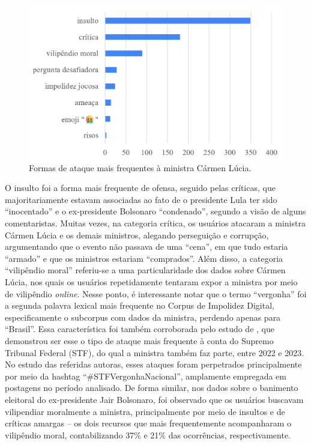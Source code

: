 \documentclass[portuguese]{textolivre}
\begin{document}
\begin{figure}[h!]
\centering
\begin{minipage}{.70\textwidth}
\includegraphics[width =\textwidth]{Fig7.png}
\caption{Formas de ataque mais frequentes à ministra Cármen Lúcia.}
\label{graf-5}
\end{minipage}
\end{figure}

O insulto foi a forma mais frequente de ofensa, seguido pelas críticas, que majoritariamente estavam associadas ao fato de o presidente Lula ter sido ``inocentado'' e o ex-presidente Bolsonaro ``condenado'', segundo a visão de alguns comentaristas. Muitas vezes, na categoria crítica, os usuários atacaram a ministra Cármen Lúcia e os demais ministros, alegando perseguição e corrupção, argumentando que o evento não passava de uma ``cena'', em que tudo estaria ``armado'' e que os ministros estariam ``comprados''. Além disso, a categoria ``vilipêndio moral'' referiu-se a uma particularidade dos dados sobre Cármen Lúcia, nos quais os usuários repetidamente tentaram expor a ministra por meio de vilipêndio \textit{online}. Nesse ponto, é interessante notar que o termo ``vergonha'' foi a segunda palavra lexical mais frequente no Corpus de Impolidez Digital, especificamente o subcorpus com dados da ministra, perdendo apenas para ``Brasil''. Essa característica foi também corroborada pelo estudo de \textcite{oliveira2024}, que demonstrou ser esse o tipo de ataque mais frequente à conta do Supremo Tribunal Federal (STF), do qual a ministra também faz parte, entre 2022 e 2023. No estudo das referidas autoras, esses ataques foram perpetrados principalmente por meio da hashtag ``\#STFVergonhaNacional'', amplamente empregada em postagens no período analisado. De forma similar, nos dados sobre o banimento eleitoral do ex-presidente Jair Bolsonaro, foi observado que os usuários buscavam vilipendiar moralmente a ministra, principalmente por meio de insultos e de críticas amargas – os dois recursos que mais frequentemente acompanharam o vilipêndio moral, contabilizando 37\% e 21\% das ocorrências, respectivamente.
\end{document}
